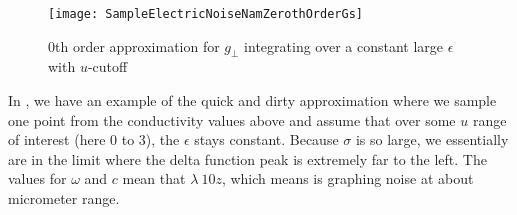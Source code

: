 \documentclass[11pt]{article}
\begin{document}
	\begin{figure}[htp]
		\centering
		\texttt{[image: SampleElectricNoiseNamZerothOrderGs]}
		\caption{0th order approximation for $g_\perp$ integrating over a constant large $\epsilon$ with $u$-cutoff} \label{fig:NamZerothOrderGs}
	\end{figure}

	In , we have an example of the quick and dirty approximation where we sample one point from the conductivity values above and assume that over some $u$ range of interest (here $0$ to $3$), the $\epsilon$ stays constant.
	Because $\sigma$ is so large, we essentially are in the limit where the delta function peak is extremely far to the left.
	The values for $\omega$ and $c$ mean that $\lambda ~ 10 z$, which means  is graphing noise at about micrometer range.

	\newpage
	\listoftodos
	\newpage
	\printbibliography
\end{document}
